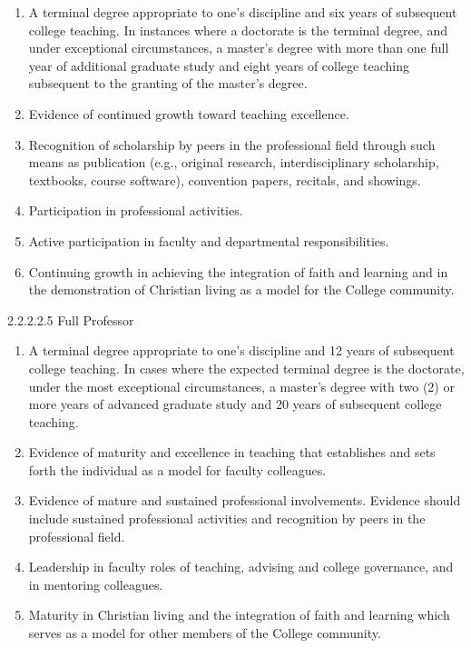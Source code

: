 \documentclass[letterpaper, 11pt]{article}
\begin{document}
				\begin{enumerate}[label=\alph*)]
					\item{A terminal degree appropriate to one's discipline and six years of subsequent college teaching. In instances where a doctorate is the terminal degree, and under exceptional circumstances, a master's degree with more than one full year of additional graduate study and eight years of college teaching subsequent to the granting of the master's degree.}
					\item{Evidence of continued growth toward teaching excellence.}
					\item{Recognition of scholarship by peers in the professional field through such means as publication (e.g., original research, interdisciplinary scholarship, textbooks, course software), convention papers, recitals, and showings.}
					\item{Participation in professional activities.}
					\item{Active participation in faculty and departmental responsibilities.}
					\item{Continuing growth in achieving the integration of faith and learning and in the demonstration of Christian living as a model for the College community.}
				\end{enumerate}
				2.2.2.2.5 Full Professor
				\begin{enumerate}[label=\alph*)]
					\item{A terminal degree appropriate to one's discipline and 12 years of subsequent college teaching. In cases where the expected terminal degree is the doctorate, under the most exceptional circumstances, a master's degree with two (2) or more years of advanced graduate study and 20 years of subsequent college teaching.}
					\item{Evidence of maturity and excellence in teaching that establishes and sets forth the individual as a model for faculty colleagues.}
					\item{Evidence of mature and sustained professional involvements. Evidence should include sustained professional activities and recognition by peers in the professional field.}
					\item{Leadership in faculty roles of teaching, advising and college governance, and in mentoring colleagues.}
					\item{Maturity in Christian living and the integration of faith and learning which serves as a model for other members of the College community.}
				\end{enumerate}
\end{document}
